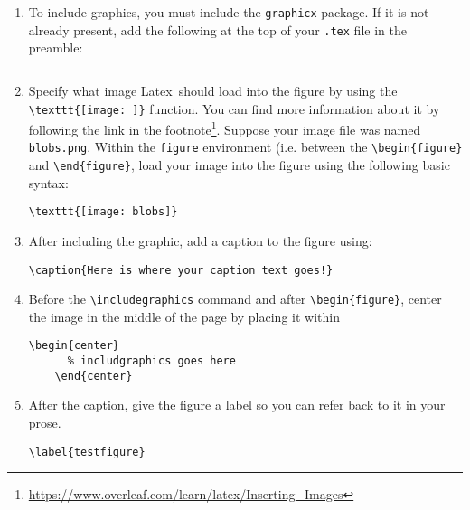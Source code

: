 \documentclass[10pt]{article}
\renewcommand{\LaTeX}{Latex}
\begin{document}
\begin{enumerate}
\item To include graphics, you must include the \lstinline{graphicx} package. If it is not already present, add the following at the top of your \lstinline{.tex} file in the preamble:
  \begin{lstlisting}[basicstyle=\ttfamily\footnotesize]
     % include graphicx package to use \includegraphics
  \end{lstlisting}
  
\item Specify what image \LaTeX\ should load into the figure by using the \lstinline$\texttt{[image: ]}$ function. You can find more information about it by following the link in the footnote\footnote{\url{https://www.overleaf.com/learn/latex/Inserting_Images}}. Suppose your image file was named \lstinline{blobs.png}. Within the \lstinline{figure} environment (i.e. between the \lstinline$\begin{figure}$ and \lstinline$\end{figure}$, load your image into the figure using the following basic syntax:
  \begin{lstlisting}[basicstyle=\ttfamily\footnotesize]
    \texttt{[image: blobs]}
  \end{lstlisting}
  
\item After including the graphic, add a caption to the figure using:
  \begin{lstlisting}[basicstyle=\ttfamily\footnotesize]
    \caption{Here is where your caption text goes!}
  \end{lstlisting}
  
\item Before the \lstinline{\includegraphics} command and after \lstinline$\begin{figure}$, center the image in the middle of the page by placing it within
  \begin{lstlisting}[basicstyle=\ttfamily\footnotesize]
    \begin{center}
      % includgraphics goes here
    \end{center}
  \end{lstlisting}
  
\item After the caption, give the figure a label so you can refer back to it in your prose.
  \begin{lstlisting}[basicstyle=\ttfamily\footnotesize]
    \label{testfigure}
  \end{lstlisting}
  

\end{enumerate}
\end{document}
